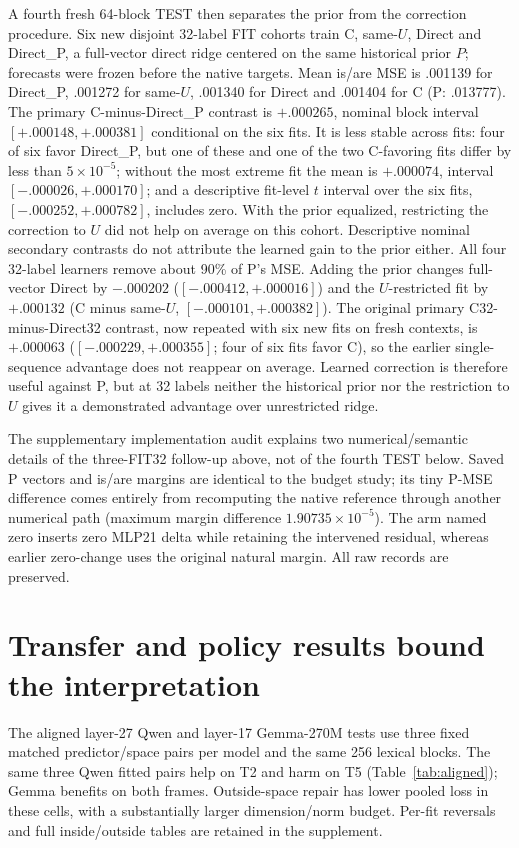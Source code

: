 \documentclass[11pt]{article}
\begin{document}
A fourth fresh 64-block TEST then separates the prior from the correction procedure. Six new disjoint 32-label FIT cohorts train C, same-$U$, Direct and Direct\_P, a full-vector direct ridge centered on the same historical prior $P$; forecasts were frozen before the native targets. Mean is/are MSE is .001139 for Direct\_P, .001272 for same-$U$, .001340 for Direct and .001404 for C (P: .013777). The primary C-minus-Direct\_P contrast is $+.000265$, nominal block interval $[+.000148,+.000381]$ conditional on the six fits. It is less stable across fits: four of six favor Direct\_P, but one of these and one of the two C-favoring fits differ by less than $5\times10^{-5}$; without the most extreme fit the mean is $+.000074$, interval $[-.000026,+.000170]$; and a descriptive fit-level $t$ interval over the six fits, $[-.000252,+.000782]$, includes zero. With the prior equalized, restricting the correction to $U$ did not help on average on this cohort. Descriptive nominal secondary contrasts do not attribute the learned gain to the prior either. All four 32-label learners remove about 90\% of P's MSE. Adding the prior changes full-vector Direct by $-.000202$ ($[-.000412,+.000016]$) and the $U$-restricted fit by $+.000132$ (C minus same-$U$, $[-.000101,+.000382]$). The original primary C32-minus-Direct32 contrast, now repeated with six new fits on fresh contexts, is $+.000063$ ($[-.000229,+.000355]$; four of six fits favor C), so the earlier single-sequence advantage does not reappear on average. Learned correction is therefore useful against P, but at 32 labels neither the historical prior nor the restriction to $U$ gives it a demonstrated advantage over unrestricted ridge.

The supplementary implementation audit explains two numerical/semantic details of the three-FIT32 follow-up above, not of the fourth TEST below. Saved P vectors and is/are margins are identical to the budget study; its tiny P-MSE difference comes entirely from recomputing the native reference through another numerical path (maximum margin difference $1.90735\times10^{-5}$). The arm named zero inserts zero MLP21 delta while retaining the intervened residual, whereas earlier zero-change uses the original natural margin. All raw records are preserved.

\section{Transfer and policy results bound the interpretation}
The aligned layer-27 Qwen and layer-17 Gemma-270M tests use three fixed matched predictor/space pairs per model and the same 256 lexical blocks. The same three Qwen fitted pairs help on T2 and harm on T5 (Table~\ref{tab:aligned}); Gemma benefits on both frames. Outside-space repair has lower pooled loss in these cells, with a substantially larger dimension/norm budget. Per-fit reversals and full inside/outside tables are retained in the supplement.
\end{document}
